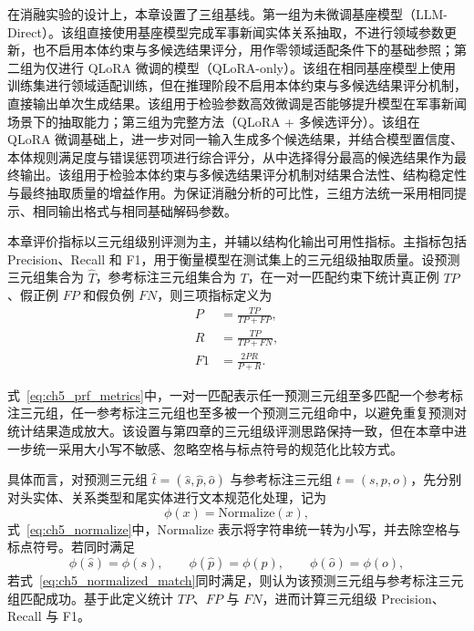在消融实验的设计上，本章设置了三组基线。第一组为未微调基座模型（LLM-Direct）。该组直接使用基座模型完成军事新闻实体关系抽取，不进行领域参数更新，也不启用本体约束与多候选结果评分，用作零领域适配条件下的基础参照；第二组为仅进行 QLoRA 微调的模型（QLoRA-only）。该组在相同基座模型上使用训练集进行领域适配训练，但在推理阶段不启用本体约束与多候选结果评分机制，直接输出单次生成结果。该组用于检验参数高效微调是否能够提升模型在军事新闻场景下的抽取能力；第三组为完整方法（QLoRA + 多候选评分）。该组在 QLoRA 微调基础上，进一步对同一输入生成多个候选结果，并结合模型置信度、本体规则满足度与错误惩罚项进行综合评分，从中选择得分最高的候选结果作为最终输出。该组用于检验本体约束与多候选结果评分机制对结果合法性、结构稳定性与最终抽取质量的增益作用。为保证消融分析的可比性，三组方法统一采用相同提示、相同输出格式与相同基础解码参数。

本章评价指标以三元组级别评测为主，并辅以结构化输出可用性指标。主指标包括 Precision、Recall 和 F1，用于衡量模型在测试集上的三元组级抽取质量。设预测三元组集合为 $\hat{T}$，参考标注三元组集合为 $T$，在一对一匹配约束下统计真正例 $TP$、假正例 $FP$ 和假负例 $FN$，则三项指标定义为
\begin{equation}
\begin{aligned}
P&=\frac{TP}{TP+FP},\\
R&=\frac{TP}{TP+FN},\\
F1&=\frac{2PR}{P+R}.
\end{aligned}
\label{eq:ch5_prf_metrics}
\end{equation}

式~\eqref{eq:ch5_prf_metrics}中，一对一匹配表示任一预测三元组至多匹配一个参考标注三元组，任一参考标注三元组也至多被一个预测三元组命中，以避免重复预测对统计结果造成放大。该设置与第四章的三元组级评测思路保持一致，但在本章中进一步统一采用大小写不敏感、忽略空格与标点符号的规范化比较方式。

具体而言，对预测三元组 $\hat{t}=(\hat{s},\hat{p},\hat{o})$ 与参考标注三元组 $t=(s,p,o)$，先分别对头实体、关系类型和尾实体进行文本规范化处理，记为
\begin{equation}
\phi(x)=\mathrm{Normalize}(x),
\label{eq:ch5_normalize}
\end{equation}
式~\eqref{eq:ch5_normalize}中，Normalize 表示将字符串统一转为小写，并去除空格与标点符号。若同时满足
\begin{equation}
\phi(\hat{s})=\phi(s), \qquad
\phi(\hat{p})=\phi(p), \qquad
\phi(\hat{o})=\phi(o),
\label{eq:ch5_normalized_match}
\end{equation}
若式~\eqref{eq:ch5_normalized_match}同时满足，则认为该预测三元组与参考标注三元组匹配成功。基于此定义统计 $TP$、$FP$ 与 $FN$，进而计算三元组级 Precision、Recall 与 F1。

